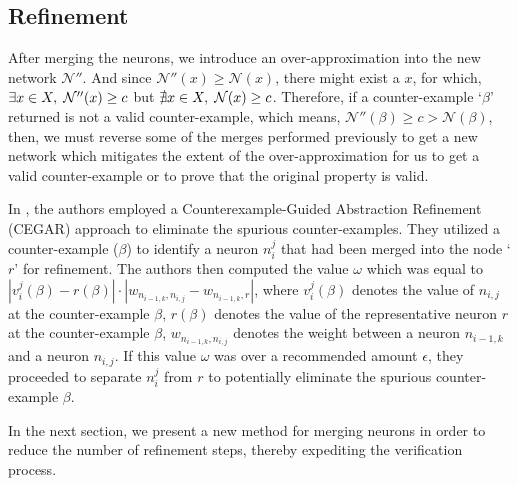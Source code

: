 \subsection{Refinement }
After merging the neurons, we introduce an over-approximation into the new network $\mathcal{N''}$. And since $\mathcal{N''}(x) \geq \mathcal{N}(x)$, there might exist a $x$, for which, $\exists x \in X, \hspace{1mm} \mathcal{N''}(x) \geq c$ but $\nexists x \in X, \hspace{1mm} \mathcal{N}(x) \geq c$. Therefore, if a counter-example `$\beta$' returned is not a valid counter-example, which means, $\mathcal{N''}(\beta) \geq c > \mathcal{N}(\beta)$, then, we must reverse some of the merges performed previously to get a new network which mitigates the extent of the over-approximation for us to get a valid counter-example or to prove that the original property is valid.

In \cite{b2}, the authors employed a Counterexample-Guided Abstraction Refinement (CEGAR) approach to eliminate the spurious counter-examples. They utilized a counter-example ($\beta$) to identify a neuron $n_i^j$ that had been merged into the node `$r$' for refinement. The authors then computed the value $\omega$ which was equal to $|v_i^j(\beta) - r(\beta)| \cdot |w_{n_{i-1,k},n_{i,j}}-w_{n_{i-1,k},r}|$, where $v_i^j(\beta)$ denotes the value of $n_{i,j}$ at the counter-example $\beta$, $r(\beta)$ denotes the value of the representative neuron $r$ at the counter-example $\beta$, $w_{n_{i-1,k},n_{i,j}}$ denotes the weight between a neuron $n_{i-1,k}$ and a neuron $n_{i,j}$. If this value $\omega$ was over a recommended amount $\epsilon$, they proceeded to separate $n_i^j$ from $r$ to potentially eliminate the spurious counter-example $\beta$.


 In the next section, we present a new method for merging neurons in order to reduce the number of refinement steps, thereby expediting the verification process.
